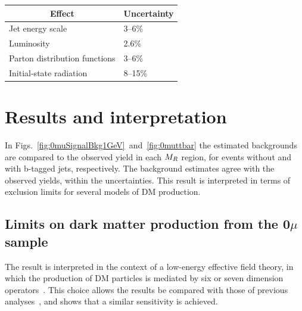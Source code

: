 \begin{table}
 \centering
 \begin{tabular}{ll}
  \hline
  \multicolumn{1}{c}{Effect}  &  \multicolumn{1}{c}{Uncertainty}\\
  \hline
  Jet energy scale  &  3--6\%\\
  Luminosity  &  2.6\%\\
  Parton distribution functions  &  3--6\%\\
  Initial-state radiation  &  8--15\%\\
  \hline
\end{tabular}
\end{table}

\section{Results and interpretation}\label{sec:interpretation}

In Figs.~\ref{fig:0muSignalBkg1GeV}~and~\ref{fig:0muttbar} the
estimated backgrounds are compared to the observed yield in each
$M_R$ region, for events without and with
b-tagged jets, respectively. The background estimates agree with the observed
yields, within the uncertainties. This result is interpreted in terms of exclusion limits
for several models of DM production.



\subsection{Limits on dark matter production from the \texorpdfstring{0$\mu$}{0 mu} sample}\label{0muResults}
\label{sec:EFT0mu}
The result is interpreted in the context of a low-energy effective
field theory, in which
the production of DM particles is mediated by six or seven dimension
operators~\cite{maverickDM,TevatronDMFrontier}. This choice allows
the results be compared with those of previous
analyses~\cite{Aad:2011xw,Chatrchyan:2012me},
and shows that a similar sensitivity is achieved.

